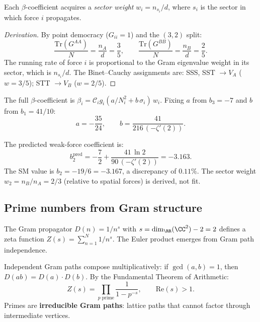 Each $\beta$-coefficient acquires a \emph{sector weight} $w_i = n_{s_i}/d$, where $s_i$ is the sector in which force $i$ propagates.

\begin{proof}[Derivation]
By point democracy ($G_{ii} = 1$) and the $(3,2)$ split:
\begin{equation}
\frac{\mathrm{Tr}(G^{AA})}{N} = \frac{n_A}{d} = \frac{3}{5}, \qquad \frac{\mathrm{Tr}(G^{BB})}{N} = \frac{n_B}{d} = \frac{2}{5}.
\end{equation}
The running rate of force $i$ is proportional to the Gram eigenvalue weight in its sector, which is $n_{s_i}/d$.  The Binet--Cauchy assignments are: SSS, SST $\to V_A$ ($w = 3/5$); STT $\to V_B$ ($w = 2/5$).
\end{proof}

The full $\beta$-coefficient is $\beta_i = \mathcal{C}_i g_i (a/N_i^2 + b\,\sigma_i)\,w_i$.  Fixing $a$ from $b_3 = -7$ and $b$ from $b_1 = 41/10$:
\begin{equation}
a = -\frac{35}{24}, \qquad b = \frac{41}{216\,(-\zeta'(2))}.
\end{equation}

The predicted weak-force coefficient is:
\begin{equation}
\boxed{b_2^{\mathrm{pred}} = -\frac{7}{2} + \frac{41\,\ln 2}{90\,(-\zeta'(2))} = -3.163.}
\end{equation}
The SM value is $b_2 = -19/6 = -3.167$, a discrepancy of $0.11\%$.  The sector weight $w_2 = n_B/n_A = 2/3$ (relative to spatial forces) is derived, not fit.

\subsection{Prime numbers from Gram structure}
\label{sec:primes}

The Gram propagator $D(n) = 1/n^s$ with $s = \dim_\RR(\CC^2) - 2 = 2$ defines a zeta function $Z(s) = \sum_{n=1}^N 1/n^s$.  The Euler product emerges from Gram path independence.

\begin{theorem}
\label{thm:euler_product}
Independent Gram paths compose multiplicatively: if $\gcd(a,b)=1$, then $D(ab)=D(a)\cdot D(b)$.  By the Fundamental Theorem of Arithmetic:
\begin{equation}
Z(s) = \prod_{p\;\mathrm{prime}} \frac{1}{1-p^{-s}}, \qquad \mathrm{Re}(s)>1.
\end{equation}
Primes are \textbf{irreducible Gram paths}: lattice paths that cannot factor through intermediate vertices.
\end{theorem}

